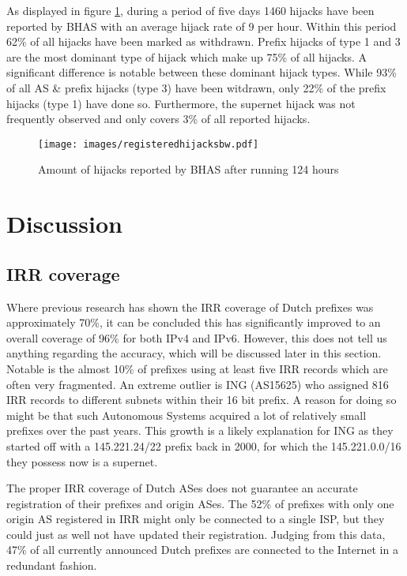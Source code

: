As displayed in figure \ref{fig:registeredhijacks}, during a period of five days 1460 hijacks have been reported by BHAS with an average hijack rate of 9 per hour. Within this period 62\% of all hijacks have been marked as withdrawn. Prefix hijacks of type 1 and 3 are the most dominant type of hijack which make up 75\% of all hijacks. A significant difference is notable between these dominant hijack types. While 93\% of all AS \& prefix hijacks (type 3) have been witdrawn, only 22\% of the prefix hijacks (type 1) have done so. Furthermore, the supernet hijack was not frequently observed and only covers 3\% of all reported hijacks.

\begin{figure}[h]
    \centering
    \texttt{[image: images/registeredhijacksbw.pdf]}
    \caption{Amount of hijacks reported by BHAS after running 124 hours}
    \label{fig:registeredhijacks}
\end{figure}

\section{Discussion}\label{sec:discussion}
\subsection{IRR coverage}\label{subsec:irrcoverage}
Where previous research has shown the IRR coverage of Dutch prefixes was approximately 70\%, it can be concluded this has significantly improved to an overall coverage of 96\% for both IPv4 and IPv6. However, this does not tell us anything regarding the accuracy, which will be discussed later in this section. Notable is the almost 10\% of prefixes using at least five IRR records which are often very fragmented. An extreme outlier is ING (AS15625) who assigned 816 IRR records to different subnets within their 16 bit prefix. A reason for doing so might be that such Autonomous Systems acquired a lot of relatively small prefixes over the past years. This growth is a likely explanation for ING as they started off with a 145.221.24/22 prefix back in 2000\cite{ripestats}, for which the 145.221.0.0/16 they possess now is a supernet.\par

The proper IRR coverage of Dutch ASes does not guarantee an accurate registration of their prefixes and origin ASes. The 52\% of prefixes with only one origin AS registered in IRR might only be connected to a single ISP, but they could just as well not have updated their registration. Judging from this data, 47\% of all currently announced Dutch prefixes are connected to the Internet in a redundant fashion.\par

